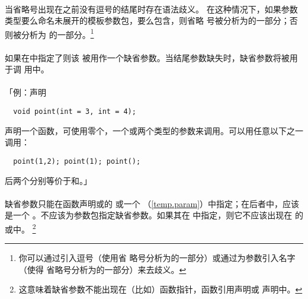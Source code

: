 \paragraph{}
当省略号出现在之前没有逗号的结尾时存在语法歧义。
在这种情况下，如果参数类型要么命名未展开的模板参数包，要么包含，则省略
号被分析为的一部分；否则被分析为
的一部分。\footnote{你可以通过引入逗号（使用省
略号分析为的一部分）或通过为参数引入名字（使得
省略号分析为的一部分）来去歧义。}

\paragraph{}
如果在中指定了则该
被用作一个缺省参数。当结尾参数缺失时，缺省参数将被用于调
用中。

\paragraph{}
「例：声明
\begin{lstlisting}
  void point(int = 3, int = 4);
\end{lstlisting}
声明一个函数，可使用零个，一个或两个类型的参数来调用。可以用任意以下之一
调用：
\begin{lstlisting}
  point(1,2); point(1); point();
\end{lstlisting}
后两个分别等价于和。」

\paragraph{}
缺省参数只能在函数声明或的
或一个
（\ref{temp.param}）中指定；在后者中，应该是一个
。不应该为参数包指定缺省参数。如果其在
中指定，则它不应该出现在
的或中。
\footnote{这意味着缺省参数不能出现在（比如）函数指针，函数引用声明或
声明中。}

